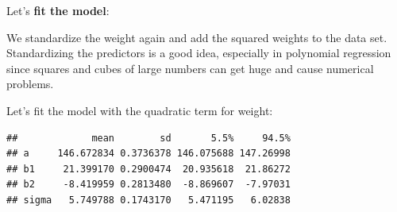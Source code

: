\documentclass[
]{book}
\newenvironment{Shaded}{\begin{snugshade}}{\end{snugshade}}
\newcommand{\AttributeTok}[1]{\textcolor[rgb]{0.13,0.29,0.53}{#1}}
\newcommand{\CommentTok}[1]{\textcolor[rgb]{0.56,0.35,0.01}{\textit{#1}}}
\newcommand{\DecValTok}[1]{\textcolor[rgb]{0.00,0.00,0.81}{#1}}
\newcommand{\FloatTok}[1]{\textcolor[rgb]{0.00,0.00,0.81}{#1}}
\newcommand{\FunctionTok}[1]{\textcolor[rgb]{0.13,0.29,0.53}{\textbf{#1}}}
\newcommand{\NormalTok}[1]{#1}
\newcommand{\OtherTok}[1]{\textcolor[rgb]{0.56,0.35,0.01}{#1}}
\newcommand{\SpecialCharTok}[1]{\textcolor[rgb]{0.81,0.36,0.00}{\textbf{#1}}}
\begin{document}
Let's \textbf{fit the model}:

We standardize the weight again and add the squared weights to the data set.
Standardizing the predictors is a good idea, especially in polynomial regression
since squares and cubes of large numbers can get huge and cause numerical problems.

Let's fit the model with the quadratic term for weight:

\begin{Shaded}
\end{Shaded}

\begin{verbatim}
##             mean        sd       5.5%     94.5%
## a     146.672834 0.3736378 146.075688 147.26998
## b1     21.399170 0.2900474  20.935618  21.86272
## b2     -8.419959 0.2813480  -8.869607  -7.97031
## sigma   5.749788 0.1743170   5.471195   6.02838
\end{verbatim}
\end{document}
